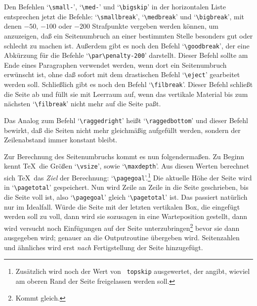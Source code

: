 Den Befehlen `\verb|\small-|', `\verb|\med-|' und 
`\verb|\bigskip|' in
der horizontalen Liste entsprechen jetzt die Befehle:
`\verb|\smallbreak|', 
`\verb|\medbreak|' und 
`\verb|\bigbreak|', mit
denen $-50$, $-100$ oder $-200$ Strafpunkte vergeben werden k\"onnen, um
anzuzeigen, da\ss{} ein Seitenumbruch an einer bestimmten Stelle besonders
gut oder schlecht zu machen ist. Au\ss{}erdem gibt es noch den Befehl
`\verb|\goodbreak|', der eine 
Abk\"urzung f\"ur die Befehle
`\verb|\par\penalty-200|' darstellt. Dieser Befehl sollte am Ende
eines Paragraphen verwendet werden, wenn dort ein Seitenumbruch
erw\"unscht ist, ohne da\ss{} sofort mit dem drastischen Befehl
`\verb|\eject|' gearbeitet werden soll. Schlie\ss{}lich gibt es noch den
Befehl 
`\verb|\filbreak|'. Dieser Befehl schlie\ss{}t die Seite ab und
f\"ullt sie mit 
Leerraum auf, wenn das vertikale Material bis zum
n\"achsten `\verb|\filbreak|' nicht mehr auf die Seite pa\ss{}t.

Das Analog zum Befehl `\verb|\raggedright|' hei\ss{}t
`\verb|\raggedbottom|' und dieser Befehl bewirkt, da\ss{} die Seiten nicht
mehr gleichm\"a\ss{}ig aufgef\"ullt werden, sondern der 
Zeilenabstand immer
konstant bleibt.

Zur Berechnung des Seitenumbruchs kommt es nun folgenderma\ss{}en. Zu
Beginn kennt \TeX\ die Gr\"o\ss{}en 
`\verb|\vsize|', sowie
`\verb|\maxdepth|'. Aus diesen Werten berechnet sich \TeX\ das {\em
Ziel} der Berechnung: 
`\verb|\pagegoal|'.\footnote{Zus\"atzlich wird noch
der Wert von {\tt{} topskip} ausgewertet, der angibt, wieviel am
oberen 
Rand der Seite freigelassen werden soll.} Die aktuelle
H\"ohe der
Seite wird in
`\verb|\pagetotal|' gespeichert. Nun wird Zeile an Zeile
in die Seite geschrieben, bis die Seite voll ist, also
`\verb|\pagegoal|' gleich `\verb|\pagetotal|' ist. Das passiert
nat\"urlich nur im Idealfall. W\"urde die Seite mit der letzten vertikalen
Box, die eingef\"ugt werden soll zu voll, dann wird sie sozusagen in
eine Warteposition gestellt, dann wird versucht noch
Einf\"ugungen auf
der Seite unterzubringen\footnote{Kommt gleich.} bevor sie dann
ausgegeben wird; genauer an die Outputroutine \"ubergeben wird.
Seitenzahlen und \"ahnliches wird erst {\em nach} Fertigstellung der
Seite hinzugef\"ugt.
